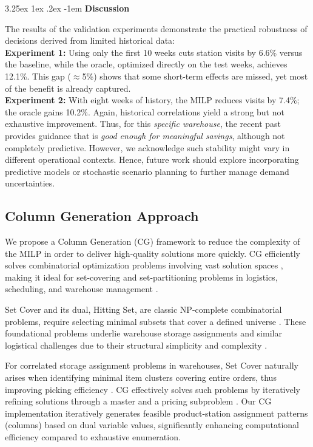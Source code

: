 \documentclass[11pt]{elsarticle}
\makeatletter
\renewcommand\paragraph{\@startsection{paragraph}{4}{\z@}
  {3.25ex \@plus1ex \@minus.2ex}
  {-1em}
  {\normalfont\normalsize\itshape}}
\makeatother
\begin{document}
\paragraph{\textbf{Discussion}}

The results of the validation experiments demonstrate the practical robustness of decisions derived from limited historical data: \\
\textbf{Experiment 1:}
Using only the first 10 weeks cuts station visits by 6.6\% versus the baseline, while the oracle, optimized directly on the test weeks, achieves 12.1\%. This gap ($\approx$5\%) shows that some short-term effects are missed, yet most of the benefit is already captured. \\
\textbf{Experiment 2:}
With eight weeks of history, the MILP reduces visits by 7.4\%; the oracle gains 10.2\%.
Again, historical correlations yield a strong but not exhaustive improvement.
Thus, for this \textit{specific warehouse}, the recent past provides guidance that is \emph{good enough for meaningful savings}, although not completely predictive. However, we acknowledge such stability might vary in different operational contexts. Hence, future work should explore incorporating predictive models or stochastic scenario planning to further manage demand uncertainties.



\subsection{Column Generation Approach}



We propose a Column Generation (CG) framework to reduce the complexity of the MILP in order to deliver high-quality solutions more quickly. CG efficiently solves combinatorial optimization problems involving vast solution spaces \cite{lubbecke2005selected}, making it ideal for set-covering and set-partitioning problems in logistics, scheduling, and warehouse management \cite{desrochers1989column}.

Set Cover and its dual, Hitting Set, are classic NP-complete combinatorial problems, require selecting minimal subsets that cover a defined universe \cite{garey1979computers}. These foundational problems underlie warehouse storage assignments and similar logistical challenges due to their structural simplicity and complexity \cite{caprara2000algorithms}.

For correlated storage assignment problems in warehouses, Set Cover naturally arises when identifying minimal item clusters covering entire orders, thus improving picking efficiency \cite{xiao2010correlated}. CG effectively solves such problems by iteratively refining solutions through a master and a pricing subproblem \cite{lubbecke2005selected}. Our CG implementation iteratively generates feasible product-station assignment patterns (columns) based on dual variable values, significantly enhancing computational efficiency compared to exhaustive enumeration.
\end{document}
